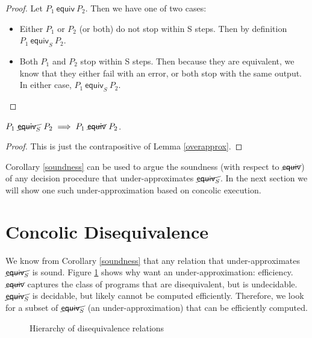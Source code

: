 \documentclass{llncs}
\newcommand{\erel}{\textsf{equiv}}
\newcommand{\merel}[1]{\textsf{equiv}_{#1}}
\newcommand{\pequiv}[2]{#1 \ \erel \ #2}
\newcommand{\pmequiv}[3]{#1 \ \merel{#3} \ #2}
\newcommand{\pnequiv}[2]{#1 \ \cancel{\erel} \ #2}
\newcommand{\pnmequiv}[3]{#1 \ \cancel{\merel{#3}} \ #2}
\begin{document}
\begin{proof}
Let $\pequiv{P_1}{P_2}$. Then we have one of two cases:
\begin{itemize}
\item Either $P_1$ or $P_2$ (or both) do not stop within S steps. Then by definition $\pmequiv{P_1}{P_2}{S}$.
\item Both $P_1$ and $P_2$ stop within S steps. Then because they are equivalent, we know that they either fail with an error, or both stop with the same output. In either case, $\pmequiv{P_1}{P_2}{S}$.
\end{itemize}
\end{proof}

\begin{corollary}
\label{soundness}
$\pnmequiv{P_1}{P_2}{S} \implies \pnequiv{P_1}{P_2}$. 
\end{corollary}

\begin{proof}
This is just the contrapositive of Lemma \ref{overapprox}.
\end{proof}

Corollary \ref{soundness} can be used to argue the soundness (with respect to $\cancel{\erel}$) of any decision procedure that under-approximates $\cancel{\merel{S}}$. In the next section we will show one such under-approximation based on concolic execution.

\section{Concolic Disequivalence}
\label{ideasection}

We know from Corollary \ref{soundness} that any relation that under-approximates $\cancel{\merel{S}}$ is sound. Figure \ref{hierarchy}  shows why want an under-approximation: efficiency. $\cancel{\erel}$ captures the class of programs that are disequivalent, but is undecidable. $\cancel{\merel{S}}$ is decidable, but likely cannot be computed efficiently. Therefore, we look for a subset of $\cancel{\merel{S}}$ (an under-approximation) that can be efficiently computed.

\begin{figure}
\def\firstcircle{(0,-1.8cm) circle (1.2cm)}
\def\secondcircle{(0,-1cm) circle (2cm)}
\def\thirdcircle{(0,0) circle (3cm)}
\label{hierarchy}
\caption{Hierarchy of disequivalence relations}
\end{figure}
\end{document}
